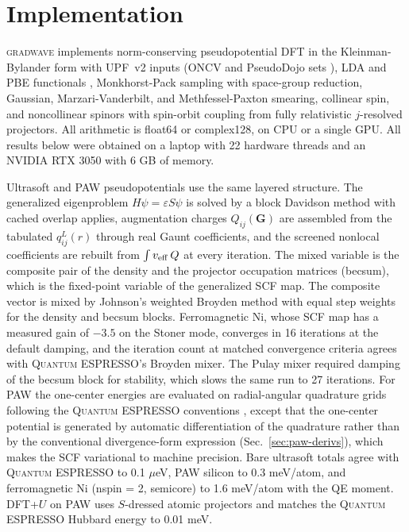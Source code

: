 \documentclass[11pt,twocolumn]{article}
\newcommand{\gw}{\textsc{gradwave}}
\newcommand{\qe}{\textsc{Quantum ESPRESSO}}
\begin{document}
\section{Implementation}
\label{sec:impl}

\gw{} implements norm-conserving pseudopotential DFT in the
Kleinman-Bylander form with UPF~v2 inputs (ONCV and PseudoDojo sets
\cite{hamann2013,schlipf2015,vansetten2018}), LDA and PBE functionals
\cite{pbe1996}, Monkhorst-Pack sampling with space-group reduction,
Gaussian, Marzari-Vanderbilt, and Methfessel-Paxton smearing, collinear
spin, and noncollinear spinors with spin-orbit coupling from fully
relativistic $j$-resolved projectors. All arithmetic is float64 or
complex128, on CPU or a single GPU. All results below were obtained on a
laptop with 22 hardware threads and an NVIDIA RTX 3050 with 6 GB of memory.

Ultrasoft and PAW pseudopotentials \cite{vanderbilt1990,blochl1994} use the
same layered structure. The generalized eigenproblem $H\psi = \varepsilon
S\psi$ is solved by a block Davidson method with cached overlap applies,
augmentation charges $Q_{ij}(\mathbf{G})$ are assembled from the
tabulated $q^L_{ij}(r)$ through real Gaunt coefficients, and the screened
nonlocal coefficients are rebuilt from $\int v_{\rm eff}\,Q$ at every
iteration. The mixed variable is the composite pair of the density and the
projector occupation matrices (becsum), which is the fixed-point variable
of the generalized SCF map. The composite vector is mixed by
Johnson's weighted Broyden method \cite{johnson1988} with equal step
weights for the density and becsum blocks. Ferromagnetic Ni, whose SCF map
has a measured gain of $-3.5$ on the Stoner mode, converges in 16
iterations at the default damping, and the iteration count at matched
convergence criteria agrees with \qe's Broyden mixer. The Pulay mixer required
damping of the becsum block for stability, which slows the same run to 27
iterations. For PAW the one-center energies are
evaluated on radial-angular quadrature grids following the \qe{}
conventions \cite{dalcorso2014}, except that the one-center potential is
generated by automatic differentiation of the quadrature rather than by the
conventional divergence-form expression (Sec.~\ref{sec:paw-derivs}), which
makes the SCF variational to machine precision. Bare ultrasoft totals agree with \qe{} to 0.1 $\mu$eV, PAW
silicon to 0.3 meV/atom, and ferromagnetic Ni (nspin = 2, semicore) to 1.6
meV/atom with the QE moment. DFT+$U$ on PAW uses $S$-dressed atomic
projectors and matches the \qe{} Hubbard energy to 0.01 meV.
\end{document}
